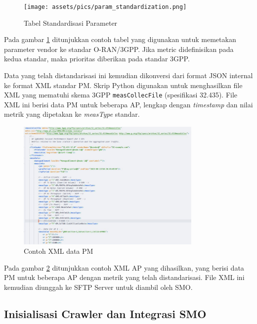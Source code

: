 \begin{figure}[htbp]
    \centering
    \texttt{[image: assets/pics/param\_standardization.png]}
    \caption{Tabel Standardisasi Parameter}
    \label{fig:param_standardization}
\end{figure}

Pada gambar \ref{fig:param_standardization} ditunjukkan contoh tabel yang digunakan untuk memetakan parameter vendor ke standar O-RAN/3GPP. Jika metric didefinisikan pada kedua standar, maka prioritas diberikan pada standar 3GPP.

Data yang telah distandarisasi ini kemudian dikonversi dari format JSON internal ke format XML standar PM. Skrip Python digunakan untuk menghasilkan file XML yang mematuhi skema 3GPP \texttt{measCollecFile} (spesifikasi 32.435). File XML ini berisi data PM untuk beberapa AP, lengkap dengan \textit{timestamp} dan nilai metrik yang dipetakan ke \textit{measType} standar.

\begin{figure}[htbp]
    \centering
    \includegraphics[width=0.8\textwidth]{assets/pics/xml_template.png}
    \caption{Contoh XML data PM}
    \label{fig:xml_template}
\end{figure}

Pada gambar \ref{fig:xml_template} ditunjukkan contoh XML AP yang dihasilkan, yang berisi data PM untuk beberapa AP dengan metrik yang telah distandarisasi. File XML ini kemudian diunggah ke SFTP Server untuk diambil oleh SMO.

\subsection{Inisialisasi Crawler dan Integrasi SMO}

